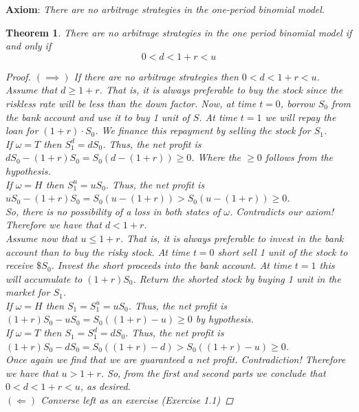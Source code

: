 \documentclass[12pt]{article}
\newtheorem{theorem}{Theorem}
\newlength\tindent
\renewcommand{\indent}{\hspace*{\tindent}}
\begin{document}
{\bf Axiom}: {\em There are no arbitrage strategies in the one-period binomial model}.

\begin{theorem} There are no arbitrage strategies in the one period binomial model if and only if
\begin{equation*}
	0 < d < 1 + r < u
\end{equation*}

\begin{proof} $(\implies)$ {\em If there are no arbitrage strategies then $0 < d < 1 + r < u$.} \\

\indent Assume that $d \geq 1 + r$. That is, it is always preferable to buy the stock since the riskless rate will be less than the down factor. Now, at time $t = 0$, borrow $S_0$ from the bank account and use it to buy 1 unit of $S$. At time $t = 1$ we will repay the loan for $(1 + r)\cdot S_0$. We finance this repayment by selling the stock for $S_1$. \\

\indent If $\omega = T$ then $S^d_1 = dS_0$. Thus, the net profit is $dS_0 - (1 + r)S_0 = S_0(d - (1 + r)) \geq 0$. Where the $\geq 0$ follows from the hypothesis. \\

\indent If $\omega = H$ then $S^u_1 = uS_0$. Thus, the net profit is $uS_0 - (1 + r)S_0 = S_0(u - (1 + r)) > S_0(u - (1 + r)) \geq 0$. \\

\indent So, there is no possibility of a loss in both states of $\omega$. Contradicts our axiom! Therefore we have that $d < 1 + r$. \\

\indent Assume now that $u \leq 1 + r$. That is, it is always preferable to invest in the bank account than to buy the risky stock. At time $t = 0$ short sell 1 unit of the stock to receive $\$S_0$. Invest the short proceeds into the bank account. At time $t = 1$ this will accumulate to $(1 + r)S_0$. Return the shorted stock by buying 1 unit in the market for $S_1$. \\

\indent If $\omega = H$ then $S_1 = S^u_1 = uS_0$. Thus, the net profit is $(1 + r)S_0 - uS_0 = S_0((1 + r) - u) \geq 0$ by hypothesis. \\

\indent If $\omega = T$ then $S_1 = S^d_1 = dS_0$. Thus, the net profit is $(1 + r)S_0 - dS_0 = S_0((1 + r) - d) > S_0((1 + r) - u) \geq 0$. \\

\indent Once again we find that we are guaranteed a net profit. Contradiction! Therefore we have that $u > 1 + r$. So, from the first and second parts we conclude that $0 < d < 1 + r < u$, as desired. \\

$(\Longleftarrow)$ {\em Converse left as an exercise (Exercise 1.1)}
\end{proof}
\end{theorem}
\end{document}
